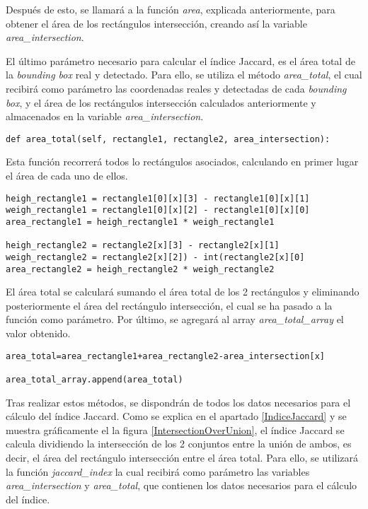 \documentclass[a4paper, 12pt, spanish, chapterprefix, numbers=noenddot]{book}
\begin{document}
Después de esto, se llamará a la función \textit{area}, explicada anteriormente, para obtener el área de los rectángulos intersección, creando así la variable \textit{area\_intersection}.

El último parámetro necesario para calcular el índice Jaccard, es el área total de la \textit{bounding box} real y detectado. Para ello, se utiliza el método \textit{area\_total}, el cual recibirá como parámetro las coordenadas reales y detectadas de cada \textit{bounding box}, y el área de los rectángulos intersección calculados anteriormente y almacenados en la variable \textit{area\_intersection}.\\

\begin{lstlisting}[frame=single]
def area_total(self, rectangle1, rectangle2, area_intersection):
\end{lstlisting}

Esta función recorrerá todos lo rectángulos asociados, calculando en primer lugar el área de cada uno de ellos.\\

\begin{lstlisting}[frame=single]
heigh_rectangle1 = rectangle1[0][x][3] - rectangle1[0][x][1]
weigh_rectangle1 = rectangle1[0][x][2] - rectangle1[0][x][0]
area_rectangle1 = heigh_rectangle1 * weigh_rectangle1

heigh_rectangle2 = rectangle2[x][3] - rectangle2[x][1]
weigh_rectangle2 = rectangle2[x][2]) - int(rectangle2[x][0]
area_rectangle2 = heigh_rectangle2 * weigh_rectangle2
\end{lstlisting}

El área total se calculará sumando el área total de los 2 rectángulos y eliminando posteriormente el área del rectángulo intersección, el cual se ha pasado a la función como parámetro. Por último, se agregará al array \textit{area\_total\_array} el valor obtenido.\\

\begin{lstlisting}[frame=single]
area_total=area_rectangle1+area_rectangle2-area_intersection[x]

area_total_array.append(area_total)
\end{lstlisting}

Tras realizar estos métodos, se dispondrán de todos los datos necesarios para el cálculo del índice Jaccard. Como se explica en el apartado \ref{IndiceJaccard} y se muestra gráficamente el la figura \ref{IntersectionOverUnion}, el índice Jaccard se calcula dividiendo la intersección de los 2 conjuntos entre la unión de ambos, es decir, el área del rectángulo intersección entre el área total. Para ello, se utilizará la función \textit{jaccard\_index} la cual recibirá como parámetro las variables \textit{area\_intersection} y \textit{area\_total}, que contienen los datos necesarios para el cálculo del índice.\\
\end{document}
